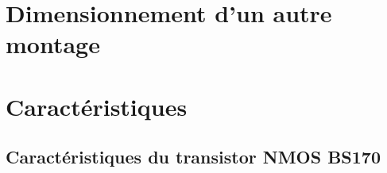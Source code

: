 \documentclass{../../template/tp}
\begin{document}
\section{Dimensionnement d'un autre montage}

\appendix
\vspace*{-3cm}
\section{Caractéristiques}
\subsection{Caractéristiques du transistor NMOS BS170}
\label{anx:mos_doc}
\end{document}
